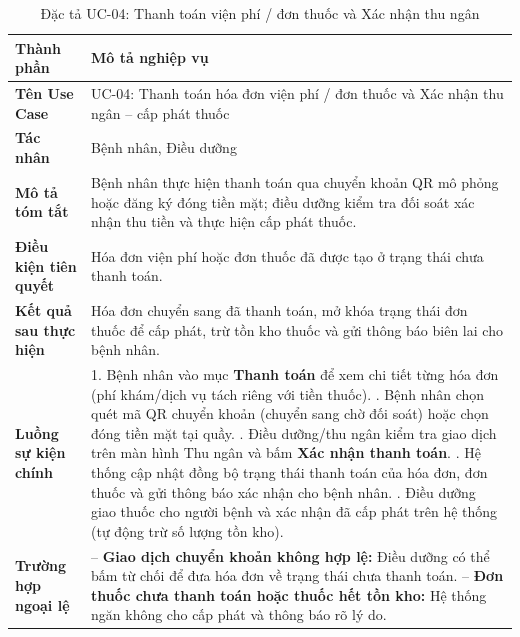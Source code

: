 \documentclass[12pt,a4paper]{report}
\begin{document}
\begin{table}[H]
  \centering
  \caption{Đặc tả UC-04: Thanh toán viện phí / đơn thuốc và Xác nhận thu ngân}
  \begin{tabularx}{\textwidth}{@{}l X@{}}
    \toprule
    \textbf{Thành phần} & \textbf{Mô tả nghiệp vụ} \\
    \midrule
    \textbf{Tên Use Case} & UC-04: Thanh toán hóa đơn viện phí / đơn thuốc và Xác nhận thu ngân -- cấp phát thuốc \\
    \textbf{Tác nhân} & Bệnh nhân, Điều dưỡng \\
    \textbf{Mô tả tóm tắt} & Bệnh nhân thực hiện thanh toán qua chuyển khoản QR mô phỏng hoặc đăng ký đóng tiền mặt; điều dưỡng kiểm tra đối soát xác nhận thu tiền và thực hiện cấp phát thuốc. \\
    \textbf{Điều kiện tiên quyết} & Hóa đơn viện phí hoặc đơn thuốc đã được tạo ở trạng thái chưa thanh toán. \\
    \textbf{Kết quả sau thực hiện} & Hóa đơn chuyển sang đã thanh toán, mở khóa trạng thái đơn thuốc để cấp phát, trừ tồn kho thuốc và gửi thông báo biên lai cho bệnh nhân. \\
    \textbf{Luồng sự kiện chính} &
      1. Bệnh nhân vào mục \textbf{Thanh toán} để xem chi tiết từng hóa đơn (phí khám/dịch vụ tách riêng với tiền thuốc). \newline
      2. Bệnh nhân chọn quét mã QR chuyển khoản (chuyển sang chờ đối soát) hoặc chọn đóng tiền mặt tại quầy. \newline
      3. Điều dưỡng/thu ngân kiểm tra giao dịch trên màn hình Thu ngân và bấm \textbf{Xác nhận thanh toán}. \newline
      4. Hệ thống cập nhật đồng bộ trạng thái thanh toán của hóa đơn, đơn thuốc và gửi thông báo xác nhận cho bệnh nhân. \newline
      5. Điều dưỡng giao thuốc cho người bệnh và xác nhận đã cấp phát trên hệ thống (tự động trừ số lượng tồn kho). \\
    \textbf{Trường hợp ngoại lệ} &
      -- \textbf{Giao dịch chuyển khoản không hợp lệ:} Điều dưỡng có thể bấm từ chối để đưa hóa đơn về trạng thái chưa thanh toán. \newline
      -- \textbf{Đơn thuốc chưa thanh toán hoặc thuốc hết tồn kho:} Hệ thống ngăn không cho cấp phát và thông báo rõ lý do. \\
    \bottomrule
  \end{tabularx}
\end{table}
\end{document}

